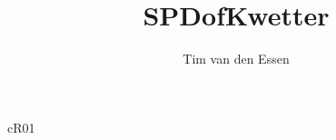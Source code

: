 \documentclass[a4paper,english]{tvde/tvde}
\title{SPD\titlepagebreak{}of\titlepagebreak{}Kwetter} %
\subtitle{} %
\author{Tim van den Essen}
\begin{document}
\maketitle{}

\begin{tedocumenthistoryS}
\end{tedocumenthistoryS}

\begin{tedistributionlist}{c}{R01}
\end{tedistributionlist}

\tedocumentStar{} %


\tetableofcontents{}
\telistoffigures{}
\telistoftables{}
\telistoflistings{}



\end{document}
